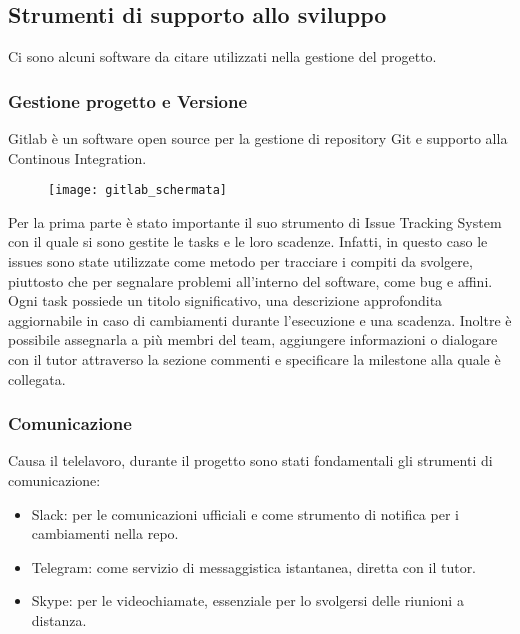 \subsection{Strumenti di supporto allo sviluppo}
Ci sono alcuni software da citare utilizzati nella gestione del progetto.

\subsubsection{Gestione progetto e Versione}
Gitlab è un software open source per la gestione di repository \gls{Git} e supporto alla Continous Integration.

\begin{figure}[htbp]
	\begin{center}
		\texttt{[image: gitlab\_schermata]}
	\end{center}
\end{figure}

\noindent Per la prima parte è stato importante il suo strumento di \gls{Issue Tracking System} con il quale si sono gestite le tasks e le loro scadenze.
Infatti, in questo caso le issues sono state utilizzate come metodo per tracciare i compiti da svolgere, piuttosto che per segnalare problemi all'interno del software, come bug e affini. \\
\noindent Ogni task possiede un titolo significativo, una descrizione approfondita aggiornabile in caso di cambiamenti durante l'esecuzione e una scadenza. Inoltre è possibile assegnarla a più membri del team, aggiungere informazioni o dialogare con il tutor attraverso la sezione commenti e specificare la milestone alla quale è collegata.

\subsubsection{Comunicazione}
Causa il telelavoro, durante il progetto sono stati fondamentali gli strumenti di comunicazione:
\begin{itemize}
  \item Slack: per le comunicazioni ufficiali e come strumento di notifica per i cambiamenti nella repo.
  \item Telegram: come servizio di messaggistica istantanea, diretta con il tutor.
	\item Skype: per le videochiamate, essenziale per lo svolgersi delle riunioni a distanza.
\end{itemize}


